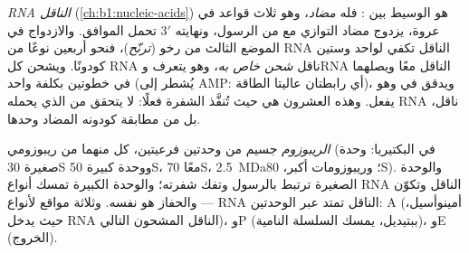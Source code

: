 \begin{definition}\label{def:b1:gene-expression:trna}
\emph{RNA الناقل} (\cref{ch:b1:nucleic-acids}) هو الوسيط بين 
: فله \emph{ مضاد}، وهو ثلاث قواعد في عروة،
يزدوج مضاد التوازي مع  من الرسول، ونهايته $3'$ تحمل  الموافق. والازدواج في الموضع الثالث من  رخو
(\emph{ترنّح})، فنحو أربعين نوعًا من RNA الناقل تكفي لواحد وستين
كودونًا. ويشحن كل RNA ناقل \emph{ شحن خاص به}، وهو  يتعرف
 وRNA الناقل معًا ويصلهما في خطوتين بكلفة  واحد
(يُشطر إلى AMP: أي رابطتان عاليتا الطاقة)، ويدقق في 
وهو يفعل. وهذه  العشرون هي حيث تُنفَّذ الشفرة فعلًا: 
لا يتحقق من  الذي يحمله RNA ناقل، بل من مطابقة كودونه
المضاد وحدها.
\end{definition}

\begin{definition}[الريبوزوم]\label{def:b1:gene-expression:ribosome}
\emph{الريبوزوم} جسيم من وحدتين فرعيتين، كل منهما من  ريبوزومي
 (في البكتيريا: وحدة صغيرة 30S ووحدة كبيرة 50S، معًا 70S،
\qty{2.5}{MDa}؛ وريبوزومات  أكبر، 80S). والوحدة
الصغيرة ترتبط بالرسول وتفك شفرته؛ والوحدة الكبيرة تمسك أنواع RNA
الناقل وتكوّن  --- والحفاز هو  نفسه.
وثلاثة مواقع لأنواع RNA الناقل تمتد عبر الوحدتين: A (أمينوأسيل، حيث يدخل
RNA الناقل المشحون التالي)، وP (ببتيديل، يمسك السلسلة النامية)،
وE (الخروج).
\end{definition}

